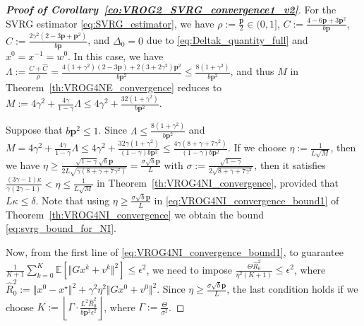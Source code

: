 \documentclass{article}
\newcommand{\norms}[1]{\Vert#1\Vert}
\newcommand{\Exp}[1]{\mathbb{E}\left[#1\right]}
\newcommand{\mbf}[1]{\mathbf{#1}}
\theoremstyle{plain}
\theoremstyle{definition}
\theoremstyle{remark}
\begin{document}
\begin{proof}[\textbf{Proof of Corollary~\ref{co:VROG2_SVRG_convergence1_v2}}]
For the SVRG estimator \eqref{eq:SVRG_estimator}, we have $\rho := \frac{\mbf{p}}{2} \in (0, 1]$, $C := \frac{4-6\mbf{p} + 3\mbf{p}^2 }{b\mbf{p}}$, $\hat{C} := \frac{2\gamma^2(2 - 3\mbf{p} + \mbf{p}^2)}{b\mbf{p}}$, and $\Delta_0 = 0$ due to \eqref{eq:Deltak_quantity_full} and $x^0 = x^{-1} = w^0$.
In this case, we have $\Lambda := \frac{C+\hat{C}}{\rho} = \frac{4(1+\gamma^2)(2 - 3\mbf{p}) + 2(3+2\gamma^2)\mbf{p}^2}{b\mbf{p}^2} \leq \frac{8(1+\gamma^2)}{b\mbf{p}^2}$, and thus $M$ in Theorem~\ref{th:VROG4NE_convergence} reduces to $M :=  4\gamma^2 + \frac{4\gamma}{1-\gamma}\Lambda \leq 4\gamma^2 + \frac{32(1+\gamma^2)}{b\mbf{p}^2}$.

Suppose that $b\mbf{p}^2 \leq 1$.
Since $\Lambda \leq \frac{ 8(1+\gamma^2) }{b\mbf{p}^2} $ and $M =  4\gamma^2 + \frac{4\gamma}{1-\gamma}\Lambda \leq 4\gamma^2 + \frac{32\gamma(1+\gamma^2)}{(1-\gamma) b\mbf{p}^2} \leq \frac{4\gamma(8 + \gamma + 7\gamma^2)}{(1-\gamma)b\mbf{p}^2}$.
If we choose $\eta := \frac{1}{L\sqrt{M}}$, then we have $\eta \geq \frac{\sqrt{1-\gamma}\sqrt{b}\mbf{p}}{2L\sqrt{\gamma(8 + \gamma + 7\gamma^2)}} = \frac{\sigma \sqrt{b}\mbf{p}}{L}$ with $\sigma := \frac{\sqrt{1-\gamma}}{2\sqrt{8 + \gamma + 7\gamma^2}}$, then it satisfies $\frac{(3\gamma-1)\kappa}{\gamma(2\gamma-1)} < \eta \leq \frac{1}{L\sqrt{M}}$ in Theorem~\ref{th:VROG4NI_convergence}, provided that $L\kappa \leq \delta$.
Note that using $\eta \geq \frac{\sigma \sqrt{b}\mbf{p}}{ L }$ in \eqref{eq:VROG4NI_convergence_bound1} of Theorem~\ref{th:VROG4NI_convergence} we obtain the bound  \eqref{eq:svrg_bound_for_NI}.

Now, from the first line of \eqref{eq:VROG4NI_convergence_bound1}, to guarantee $\frac{1}{K+1}\sum_{k=0}^K\Exp{\norms{Gx^k + v^k}^2} \leq \epsilon^2$, we need to impose $\frac{\Theta \hat{R}_0^2}{\eta^2(K+1)} \leq \epsilon^2$, where $\hat{R}_0^2 := \norms{x^0 - x^{\star}}^2 + \gamma^2\eta^2\norms{Gx^0 + v^0}^2$.
Since $\eta \geq \frac{\sigma \sqrt{b}\mbf{p}}{ L }$, the last condition holds if we choose $K :=  \left\lfloor \Gamma \cdot \frac{L^2 \hat{R}_0^2}{ b\mbf{p}^2\epsilon^2} \right\rfloor$, where $\Gamma := \frac{\Theta}{\sigma^2}$.



\end{proof}
\end{document}

